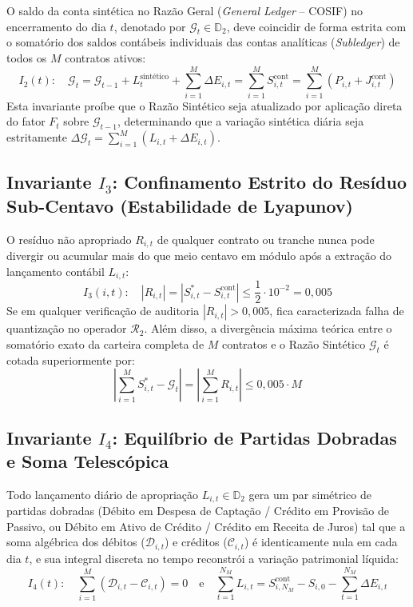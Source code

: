 \documentclass[11pt, a4paper]{article}
\begin{document}
O saldo da conta sintética no Razão Geral (\textit{General Ledger} -- COSIF) no encerramento do dia $t$, denotado por $\mathcal{G}_t \in \mathbb{D}_2$, deve coincidir de forma estrita com o somatório dos saldos contábeis individuais das contas analíticas (\textit{Subledger}) de todos os $M$ contratos ativos:
\begin{equation}
    I_2(t): \quad \mathcal{G}_t = \mathcal{G}_{t-1} + L_t^{\text{sintético}} + \sum_{i=1}^{M} \Delta E_{i,t} = \sum_{i=1}^{M} S_{i,t}^{\text{cont}} = \sum_{i=1}^{M} \left( P_{i,t} + J_{i,t}^{\text{cont}} \right)
\end{equation}
Esta invariante proíbe que o Razão Sintético seja atualizado por aplicação direta do fator $F_t$ sobre $\mathcal{G}_{t-1}$, determinando que a variação sintética diária seja estritamente $\Delta \mathcal{G}_t = \sum_{i=1}^{M} (L_{i,t} + \Delta E_{i,t})$.

\subsection{Invariante $I_3$: Confinamento Estrito do Resíduo Sub-Centavo (Estabilidade de Lyapunov)}

O resíduo não apropriado $R_{i,t}$ de qualquer contrato ou tranche nunca pode divergir ou acumular mais do que meio centavo em módulo após a extração do lançamento contábil $L_{i,t}$:
\begin{equation}
    I_3(i, t): \quad |R_{i,t}| = \left| S_{i,t}^{*} - S_{i,t}^{\text{cont}} \right| \le \frac{1}{2} \cdot 10^{-2} = 0{,}005
\end{equation}
Se em qualquer verificação de auditoria $|R_{i,t}| > 0{,}005$, fica caracterizada falha de quantização no operador $\mathcal{R}_2$. Além disso, a divergência máxima teórica entre o somatório exato da carteira completa de $M$ contratos e o Razão Sintético $\mathcal{G}_t$ é cotada superiormente por:
\begin{equation}
    \left| \sum_{i=1}^{M} S_{i,t}^{*} - \mathcal{G}_t \right| = \left| \sum_{i=1}^{M} R_{i,t} \right| \le 0{,}005 \cdot M
\end{equation}

\subsection{Invariante $I_4$: Equilíbrio de Partidas Dobradas e Soma Telescópica}

Todo lançamento diário de apropriação $L_{i,t} \in \mathbb{D}_2$ gera um par simétrico de partidas dobradas (Débito em Despesa de Captação / Crédito em Provisão de Passivo, ou Débito em Ativo de Crédito / Crédito em Receita de Juros) tal que a soma algébrica dos débitos ($\mathcal{D}_{i,t}$) e créditos ($\mathcal{C}_{i,t}$) é identicamente nula em cada dia $t$, e sua integral discreta no tempo reconstrói a variação patrimonial líquida:
\begin{equation}
    I_4(t): \quad \sum_{i=1}^{M} \left( \mathcal{D}_{i,t} - \mathcal{C}_{i,t} \right) = 0 \quad \text{e} \quad \sum_{t=1}^{N_M} L_{i,t} = S_{i,N_M}^{\text{cont}} - S_{i,0} - \sum_{t=1}^{N_M} \Delta E_{i,t}
\end{equation}
\end{document}
